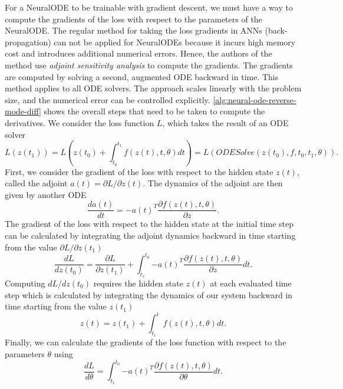 For a \gls{NeuralODE} to be trainable with gradient descent, we must have a way to compute the gradients of the loss with respect to the parameters of the \gls{NeuralODE}.
The regular method for taking the loss gradients in \glspl{ANN} (back-propagation) can not be applied for \glspl{NeuralODE} because it incurs high memory cost and introduces additional numerical errors.
Hence, the authors of the method use \textit{adjoint sensitivity analysis} to compute the gradients.
The gradients are computed by solving a second, augmented \gls{ODE} backward in time.
This method applies to all \gls{ODE} solvers.
The approach scales linearly with the problem size, and the numerical error can be controlled explicitly.
\autoref{alg:neural-ode-reverse-mode-diff} shows the overall steps that need to be taken to compute the derivatives.
We consider the loss function $L$, which takes the result of an \gls{ODE} solver
\begin{equation*}
    L(z(t_1)) = L\left(z(t_0) + \int_{t_0}^{t_1}{f(z(t), t, \theta)dt}\right) = L(ODESolve(z(t_0), f, t_0, t_1, \theta)).
\end{equation*}
First, we consider the gradient of the loss with respect to the hidden state $z(t)$, called the adjoint $a(t) = \partial L / \partial z(t)$.
The dynamics of the adjoint are then given by another \gls{ODE}
\begin{equation*}
    \frac{da(t)}{dt} = -a(t)^T\frac{\partial f(z(t), t, \theta)}{\partial z}.
\end{equation*}
The gradient of the loss with respect to the hidden state at the initial time step can be calculated by integrating the adjoint dynamics backward in time starting from the value $\partial L / \partial z(t_1)$
\begin{equation}
    \frac{dL}{dz(t_0)} = \frac{\partial L}{\partial z(t_1)} + \int_{t_1}^{t_0}{-a(t)^T\frac{\partial f(z(t), t, \theta)}{\partial z}} dt.
    \label{eq:neural-ode-loss-wrt-initial-hidden-state}
\end{equation}
Computing $dL/dz(t_0)$ requires the hidden state $z(t)$ at each evaluated time step which is calculated by integrating the dynamics of our system backward in time starting from the value $z(t_1)$
\begin{equation}
    z(t) = z(t_1) + \int_{t_1}^{t}{f(z(t), t, \theta)dt}.
    \label{eq:neural-ode-hidden-state-backward-integral}
\end{equation}
Finally, we can calculate the gradients of the loss function with respect to the parameters $\theta$ using
\begin{equation}
    \frac{dL}{d\theta} = \int_{t_1}^{t_0}{-a(t)^T\frac{\partial f(z(t), t, \theta)}{\partial \theta}} dt.
    \label{eq:neural-ode-loss-wrt-parameters}
\end{equation}
